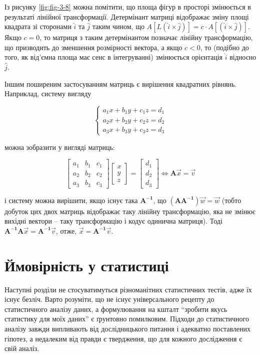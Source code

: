 \documentclass[
  11pt,
]{book}
\begin{document}
Із рисунку \ref{fig:fig-3-8} можна помітити, що площа фігур в просторі змінюється в результаті лінійної трансформації. Детермінант матриці відображає зміну площі квадрата зі сторонами \(\hat{i}\) та \(\hat{j}\) таким чином, що \(A[L(\hat{i} \times \hat{j})] = c \cdot A[(\hat{i} \times \hat{j})]\). Якщо \(c = 0\), то матриця з таким детермінантом позначає лінійну трансформацію, що призводить до зменшення розмірності вектора, а якщо \(c<0\), то (подібно до того, як від'ємна площа має сенс в інтегруванні) змінюється орієнтація \(\hat{i}\) відносно \(\hat{j}\).

Іншим поширеним застосуванням матриць є вирішення квадратних рівнянь. Наприклад, систему вигляду

\[\begin{cases}
a_1 x + b_1 y + c_1 z = d_1 \\
a_2 x + b_2 y + c_2 z = d_2 \\
a_3 x + b_3 y + c_3 z = d_3
\end{cases}\]

можна зобразити у вигляді матриць:

\[\begin{bmatrix}
a_1 & b_1 & c_1 \\
a_2 & b_2 & c_2 \\
a_3 & b_3 & c_3
\end{bmatrix}
\begin{bmatrix}
x \\
y \\
z
\end{bmatrix} = 
\begin{bmatrix}
d_1 \\
d_2 \\
d_3
\end{bmatrix} \iff \mathbf{A} \vec{x} = \vec{v}\]

і систему можна вирішити, якщо існує така \(\mathbf{A^{-1}}\), що \((\mathbf{AA^{-1}}) \vec{w} = \vec{w}\) (тобто добуток цих двох матриць відображає таку лінійну трансформацію, яка не змінює вихідні вектори -- таку трансформацію і кодує одинична матриця). Тоді \(\mathbf{A^{-1} A} \vec{x} = \mathbf{A^{-1}} \vec{v}\), отже, \(\vec{x} = \mathbf{A^{-1}} \vec{v}\).

\section{Ймовірність у статистиці}\label{stats}

Наступні розділи не стосуватимуться різноманітних статистичних тестів, адже їх існує безліч. Варто розуміти, що не існує універсального рецепту до статистичного аналізу даних, а формулювання на кшталт ``зробити якусь статистику для моїх даних'' є ґрунтовно помилковим. Підходи до статистичного аналізу завжди випливають від дослідницького питання і адекватно поставлених гіпотез, а недалеким від правди є твердження, що для кожного дослідження є свій аналіз.
\end{document}

